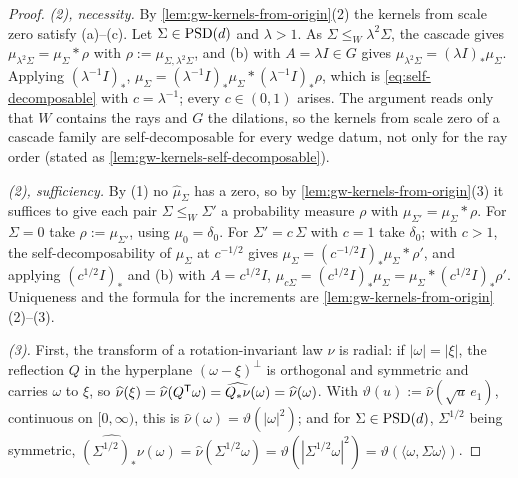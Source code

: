 \begin{proof}
\emph{(2), necessity.} By \ref{lem:gw-kernels-from-origin}(2) the kernels from scale zero satisfy (a)--(c).
Let $\Sigma \in \mathrm{PSD}(d)$ and $\lambda > 1$. As $\Sigma \le_W \lambda^2\Sigma$, the cascade gives
$\mu_{\lambda^2\Sigma} = \mu_\Sigma * \rho$ with $\rho := \mu_{\Sigma,\lambda^2\Sigma}$, and (b) with
$A = \lambda I \in G$ gives $\mu_{\lambda^2\Sigma} = (\lambda I)_*\mu_\Sigma$. Applying $(\lambda^{-1}I)_*$,
$\mu_\Sigma = (\lambda^{-1}I)_*\mu_\Sigma * (\lambda^{-1}I)_*\rho$, which is \ref{eq:self-decomposable} with
$c = \lambda^{-1}$; every $c \in (0,1)$ arises. The argument reads only that $W$ contains the rays and
$G$ the dilations, so the kernels from scale zero of a cascade family are self-decomposable for every
wedge datum, not only for the ray order (stated as \ref{lem:gw-kernels-self-decomposable}).

\emph{(2), sufficiency.} By (1) no $\widehat\mu_\Sigma$ has a zero, so by
\ref{lem:gw-kernels-from-origin}(3) it suffices to give each pair $\Sigma \le_W \Sigma'$ a probability
measure $\rho$ with $\mu_{\Sigma'} = \mu_\Sigma * \rho$. For $\Sigma = 0$ take $\rho := \mu_{\Sigma'}$,
using $\mu_0 = \delta_0$. For $\Sigma' = c\,\Sigma$ with $c = 1$ take $\delta_0$; with $c > 1$, the
self-decomposability of $\mu_\Sigma$ at $c^{-1/2}$ gives $\mu_\Sigma = (c^{-1/2}I)_*\mu_\Sigma * \rho'$, and
applying $(c^{1/2}I)_*$ and (b) with $A = c^{1/2}I$, $\mu_{c\Sigma} = (c^{1/2}I)_*\mu_\Sigma = \mu_\Sigma *
(c^{1/2}I)_*\rho'$. Uniqueness and the formula for the increments are
\ref{lem:gw-kernels-from-origin}(2)--(3).

\emph{(3).} First, the transform of a rotation-invariant law $\nu$ is radial: if $|\omega| = |\xi|$, the
reflection $Q$ in the hyperplane $(\omega - \xi)^\perp$ is orthogonal and symmetric and carries $\omega$ to $\xi$,
so $\widehat\nu(\xi) = \widehat\nu(Q^{\mathsf{T}}\omega) = \widehat{Q_*\nu}(\omega) = \widehat\nu(\omega)$. With
$\vartheta(u) := \widehat\nu(\sqrt u\,e_1)$, continuous on $[0,\infty)$, this is $\widehat\nu(\omega) = \vartheta(|\omega|^2)$; and
for $\Sigma \in \mathrm{PSD}(d)$, $\Sigma^{1/2}$ being symmetric,
$\widehat{(\Sigma^{1/2})_*\nu}(\omega) = \widehat\nu(\Sigma^{1/2}\omega) = \vartheta(|\Sigma^{1/2}\omega|^2)
= \vartheta(\langle\omega,\Sigma\omega\rangle)$.


\end{proof}

